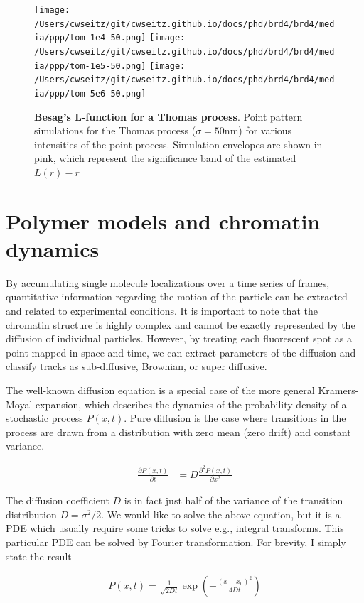 \begin{figure}
\centering
\texttt{[image: /Users/cwseitz/git/cwseitz.github.io/docs/phd/brd4/brd4/media/ppp/tom-1e4-50.png]}
\texttt{[image: /Users/cwseitz/git/cwseitz.github.io/docs/phd/brd4/brd4/media/ppp/tom-1e5-50.png]}
\texttt{[image: /Users/cwseitz/git/cwseitz.github.io/docs/phd/brd4/brd4/media/ppp/tom-5e6-50.png]}
\caption{\textbf{Besag's L-function for a Thomas process}. Point pattern simulations for the Thomas process ($\sigma=50\mathrm{nm}$) for various intensities of the point process. Simulation envelopes are shown in pink, which represent the significance band of the estimated $L(r)-r$}
\label{fig:fig18}
\end{figure}
\clearpage


\section{Polymer models and chromatin dynamics}

By accumulating single molecule localizations over a time series of frames, quantitative information regarding the motion of the particle can be extracted and related to experimental conditions. It is important to note that the chromatin structure is highly complex and cannot be exactly represented by the diffusion of individual particles. However, by treating each fluorescent spot as a point mapped in space and time, we can extract parameters of the diffusion and classify tracks as sub-diffusive, Brownian, or super diffusive. 

The well-known diffusion equation is a special case of the more general Kramers-Moyal expansion, which describes the dynamics of the probability density of a stochastic process $P(x,t)$. Pure diffusion is the case where transitions in the process are drawn from a distribution with zero mean (zero drift) and constant variance. 

\begin{align}
\frac{\partial P(x,t)}{\partial t}  &= D\frac{\partial^{2}P(x,t)}{\partial x^{2}}
\end{align}

The diffusion coefficient $D$ is in fact just half of the variance of the transition distribution $D = \sigma^{2}/2$. We would like to solve the above equation, but it is a PDE which usually require some tricks to solve e.g., integral transforms. This particular PDE can be solved by Fourier transformation. For brevity, I simply state the result

\begin{align*}
P(x,t) = \frac{1}{\sqrt{2Dt}}\exp\left(- \frac{(x-x_{0})^{2}}{4Dt}\right)
\end{align*}


